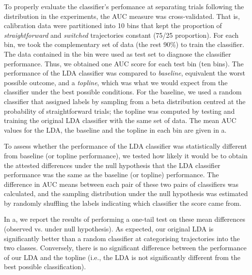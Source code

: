 \documentclass{article}
\begin{document}
To properly evaluate the classifier's perfomance at separating trials following the distribution in the experiments, the AUC measure was cross-validated. That is, calibration data were partitioned into 10 bins that kept the proportion of \textit{straightforward} and \textit{switched} trajectories constant (75/25 proportion). For each bin, we took the complementary set of data (the rest 90\%) to train the classifier. The data contained in the bin were used as test set to diagnose the classifier performance. Thus, we obtained one AUC score for each test bin (ten bins). The performance of the LDA classifier was compared to \emph{baseline}, equivalent the worst possible outcome, and a \emph{topline}, which was what we would expect from the classifier under the best possible conditions. 
For the baseline, we used a random classifier that assigned labels by sampling from a beta distribution centred at the probability of straightforward trials; the topline was computed by testing and training the original LDA classifier with the same set of data. 
The mean AUC values for the LDA, the baseline and the topline in each bin are given in a. 

To assess whether the performance of the LDA classifier was statistically different from baseline (or topline performance), we tested how likely it would be to obtain the attested differences under the null hypothesis that the LDA classifier performance was the same as the baseline (or topline) performance.   
The difference in AUC means between each pair of these two pairs of classifiers was calculated, and the sampling distribution under the null hypothesis was estimated by randomly shuffling the labels indicating which classifier the score came from.

In a, we report the results of performing a one-tail test on these mean differences (observed vs. under null hypothesis). As expected, our original LDA is significantly better than a random classifier at categorising trajectories into the two classes. Conversely, there is no significant difference between the performance of our LDA and the topline (i.e., the LDA is not significantly different from the best possible classification). 
\end{document}
